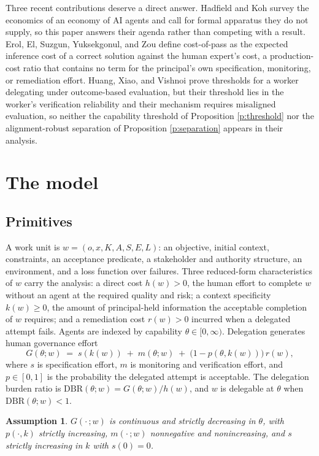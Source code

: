 \documentclass[10pt]{article}
\newtheorem{assumption}{Assumption}
\theoremstyle{remark}
\begin{document}
Three recent contributions deserve a direct answer. Hadfield and Koh survey the economics of an economy of AI agents and call for formal apparatus they do not supply, so this paper answers their agenda rather than competing with a result. Erol, El, Suzgun, Yuksekgonul, and Zou define cost-of-pass as the expected inference cost of a correct solution against the human expert's cost, a production-cost ratio that contains no term for the principal's own specification, monitoring, or remediation effort. Huang, Xiao, and Vishnoi prove thresholds for a worker delegating under outcome-based evaluation, but their threshold lies in the worker's verification reliability and their mechanism requires misaligned evaluation, so neither the capability threshold of Proposition \ref{p:threshold} nor the alignment-robust separation of Proposition \ref{p:separation} appears in their analysis.

\section{The model}

\subsection{Primitives}

A work unit is $w=(o,x,K,A,S,E,L)$: an objective, initial context, constraints, an acceptance predicate, a stakeholder and authority structure, an environment, and a loss function over failures. Three reduced-form characteristics of $w$ carry the analysis: a direct cost $h(w)>0$, the human effort to complete $w$ without an agent at the required quality and risk; a context specificity $k(w)\ge 0$, the amount of principal-held information the acceptable completion of $w$ requires; and a remediation cost $r(w)>0$ incurred when a delegated attempt fails. Agents are indexed by capability $\theta\in[0,\infty)$. Delegation generates human governance effort
\[
G(\theta;w)\;=\;s(k(w))\;+\;m(\theta;w)\;+\;\bigl(1-p(\theta,k(w))\bigr)\,r(w),
\]
where $s$ is specification effort, $m$ is monitoring and verification effort, and $p\in[0,1]$ is the probability the delegated attempt is acceptable. The delegation burden ratio is $\mathrm{DBR}(\theta;w)=G(\theta;w)/h(w)$, and $w$ is delegable at $\theta$ when $\mathrm{DBR}(\theta;w)<1$.

\begin{assumption}\label{a:mono}
$G(\cdot\,;w)$ is continuous and strictly decreasing in $\theta$, with $p(\cdot,k)$ strictly increasing, $m(\cdot\,;w)$ nonnegative and nonincreasing, and $s$ strictly increasing in $k$ with $s(0)=0$.
\end{assumption}
\end{document}
